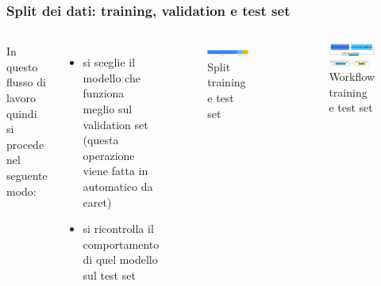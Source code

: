 \begin{frame}

	\frametitle{Split dei dati: training, validation e test set}
	\begin{columns}
		In questo flusso di lavoro quindi si procede nel seguente modo:
		\begin{itemize}
			\item si sceglie il modello che funziona meglio sul validation set (questa operazione viene fatta in automatico da caret)
			\item si ricontrolla il comportamento di quel modello sul test set
		\end{itemize}


		\begin{figure}[!htbp]
			\centering
			\includegraphics[width=1.0\linewidth]{images/supervised/validation_test_splitting_data/Training_Test_Validation_1.pdf}
			\caption{Split training e test set}
		\end{figure}

		\begin{figure}[!htbp]
			\centering
			\includegraphics[width=1.0\linewidth]{images/supervised/validation_test_splitting_data/Training_Test_Validation_2.pdf}
			\caption{Workflow training e test set}
		\end{figure}

	\end{columns}
\end{frame}


